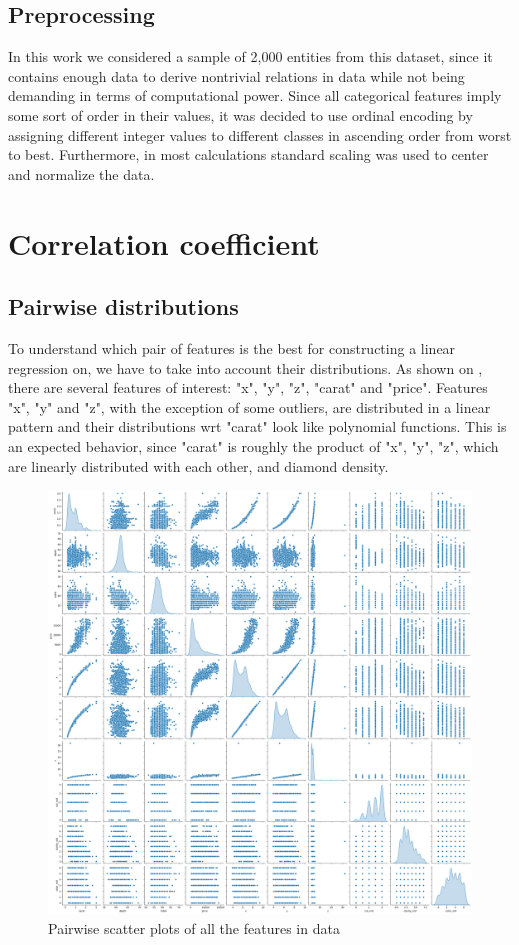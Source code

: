 \documentclass[12pt,a4paper]{article}
\begin{document}
	\subsection{Preprocessing}
	
	In this work we considered a sample of 2,000 entities from  this dataset, since it contains enough data to derive nontrivial relations in data while not being demanding in terms of computational power. Since all categorical features imply some sort of order in their values, it was decided to use ordinal encoding by assigning different integer values to different classes in ascending order from worst to best. Furthermore, in most calculations standard scaling was used to center and normalize the data.
	
	\section{Correlation coefficient}
	
	\subsection{Pairwise distributions}
	
	To understand which pair of features is the best for constructing a linear regression on, we have to take into account their distributions. As shown on , there are several features of interest: "x", "y", "z", "carat" and "price". Features "x", "y" and "z", with the exception of some outliers, are distributed in a linear pattern and their distributions wrt "carat" look like polynomial functions. This is an expected behavior, since "carat" is roughly the product of "x", "y", "z", which are linearly distributed with each other, and diamond density. 
	
	\begin{figure}[hbtp]
		\centering
		\includegraphics[width=.95\textwidth]{media/pairplot.png}
		\caption{Pairwise scatter plots of all the features in data}
		\label{fig:pairplot}
	\end{figure}
	
\end{document}
